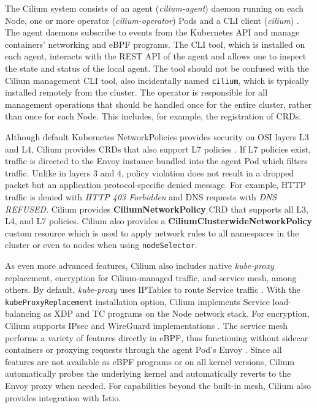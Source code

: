 \documentclass[english, 12pt, a4paper, sci, utf8, a-2b, online]{aaltothesis}
\begin{document}
The Cilium system consists of an agent (\emph{cilium-agent}) daemon running on each Node, one or more operator (\emph{cilium-operator}) Pods and a CLI client (\emph{cilium}) \cite{cilium-components}.
The agent daemons subscribe to events from the Kubernetes API and manage containers' networking and eBPF programs.
The CLI tool, which is installed on each agent, interacts with the REST API of the agent and allows one to inspect the state and status of the local agent.
The tool should not be confused with the Cilium management CLI tool, also incidentally named \lstinline{cilium}, which is typically installed remotely from the cluster.
The operator is responsible for all management operations that should be handled once for the entire cluster, rather than once for each Node.
This includes, for example, the registration of CRDs.

Although default Kubernetes NetworkPolicies provides security on OSI layers L3 and L4, Cilium provides CRDs that also support L7 policies \cite{cilium-policy-language}.
If L7 policies exist, traffic is directed to the Envoy instance bundled into the agent Pod which filters traffic.
Unlike in layers 3 and 4, policy violation does not result in a dropped packet but an application protocol-specific denied message.
For example, HTTP traffic is denied with \emph{HTTP 403 Forbidden} and DNS requests with \emph{DNS REFUSED}.
Cilium provides \textbf{CiliumNetworkPolicy} CRD that supports all L3, L4, and L7 policies.
Cilium also provides a \textbf{CiliumClusterwideNetworkPolicy} custom resource which is used to apply network rules to all namespaces in the cluster or even to nodes when using \lstinline{nodeSelector}.

As even more advanced features, Cilium also includes native \emph{kube-proxy} replacement, encryption for Cilium-managed traffic, and service mesh, among others.
By default, \emph{kube-proxy} uses IPTables to route Service traffic \cite{cilium-proxy-free}.
With the \lstinline{kubeProxyReplacement} installation option, Cilium implements Service load-balancing as XDP and TC programs on the Node network stack.
For encryption, Cilium supports IPsec and WireGuard implementations \cite{cilium-encryption}.
The service mesh performs a variety of features directly in eBPF, thus functioning without sidecar containers or proxying requests through the agent Pod's Envoy \cite{cilium-service-mesh}.
Since all features are not available as eBPF programs or on all kernel versions,  Cilium automatically probes the underlying kernel and automatically reverts to the Envoy proxy when needed.
For capabilities beyond the built-in mesh, Cilium also provides integration with Istio.
\end{document}
